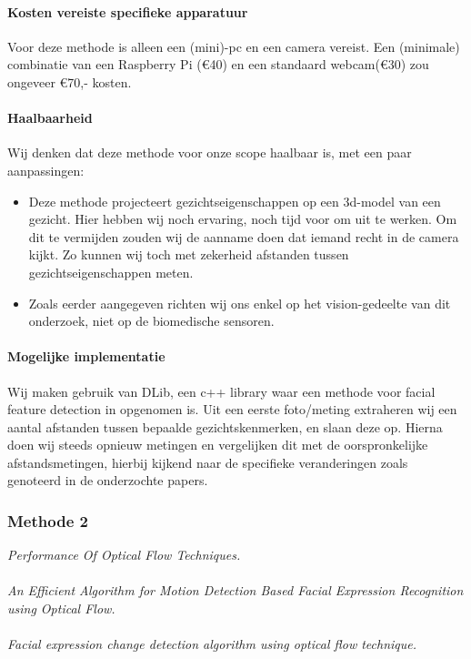\documentclass[11pt]{article}
\begin{document}
    \paragraph{Kosten vereiste specifieke apparatuur}
    Voor deze methode is alleen een (mini)-pc en een camera vereist.
    Een (minimale) combinatie van een Raspberry Pi (\euro{}40) en een standaard webcam(\euro{}30) zou ongeveer \euro{}70,- kosten.

    \paragraph{Haalbaarheid}
    Wij denken dat deze methode voor onze scope haalbaar is, met een paar aanpassingen:
    \begin{itemize}
        \item Deze methode projecteert gezichtseigenschappen op een 3d-model van een gezicht.
        Hier hebben wij noch ervaring, noch tijd voor om uit te werken.
        Om dit te vermijden zouden wij de aanname doen dat iemand recht in de camera kijkt.
        Zo kunnen wij toch met zekerheid afstanden tussen gezichtseigenschappen meten.
        \item Zoals eerder aangegeven richten wij ons enkel op het vision-gedeelte van dit onderzoek, niet op de biomedische sensoren.
    \end{itemize}

    \paragraph{Mogelijke implementatie}
    Wij maken gebruik van DLib, een c++ library waar een methode voor facial feature detection in opgenomen is.
    Uit een eerste foto/meting extraheren wij een aantal afstanden tussen bepaalde gezichtskenmerken, en slaan deze op.
    Hierna doen wij steeds opnieuw metingen en vergelijken dit met de oorspronkelijke afstandsmetingen,
    hierbij kijkend naar de specifieke veranderingen zoals genoteerd in de onderzochte papers.

    \subsubsection{Methode 2}

    \emph{\citet{barronperformance} Performance Of Optical Flow Techniques.}\\ \\
    \emph{\citet{naghsh2006efficient} An Efficient Algorithm for Motion Detection Based Facial Expression Recognition using Optical Flow.}\\ \\
    \emph{\citet{zainudinfacialexpression} Facial expression change detection algorithm using optical flow technique.}\\ \\
\end{document}
